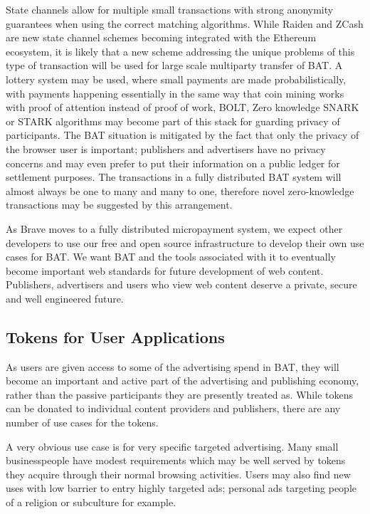 \documentclass[11pt]{article}
\begin{document}
State channels allow for multiple small transactions with strong anonymity guarantees when using the correct matching algorithms. While Raiden and ZCash are new state channel schemes becoming integrated with the Ethereum ecosystem, it is likely that a new scheme addressing the unique problems of this type of transaction will be used for large scale multiparty transfer of BAT.
 A lottery system may be used, where small payments are made probabilistically, with payments happening essentially in the same way that coin mining works with proof of attention instead of proof of work\cite{14,15}, BOLT\cite{16}, Zero knowledge SNARK\cite{17} or STARK\cite{18} algorithms may become part of this stack for guarding privacy of participants. The BAT situation is mitigated by the fact that only the privacy of the browser user is important; publishers and advertisers have no privacy concerns and may even prefer to put their information on a public ledger for settlement purposes. The transactions in a fully distributed BAT system will almost always be one to many and many to one, therefore novel zero-knowledge transactions may be suggested by this arrangement.

As Brave moves to a fully distributed micropayment system, we expect other developers to use our free and open source infrastructure to develop their own use cases for BAT. We want BAT and the tools associated with it to eventually become important web standards for future development of web content. Publishers, advertisers and users who view web content deserve a private, secure and well engineered future.
\subsection{Tokens for User Applications}
\label{sec-4-4}

As users are given access to some of the advertising spend in BAT, they will become an important and active part of the advertising and publishing economy, rather than the passive participants they are presently treated as. While tokens can be donated to individual content providers and publishers, there are any number of use cases for the tokens.

A very obvious use case is for very specific targeted advertising. Many small businesspeople have modest requirements which may be well served by tokens they acquire through their normal browsing activities. Users may also find new uses with low barrier to entry highly targeted ads; personal ads targeting people of a religion or subculture for example.
\end{document}
